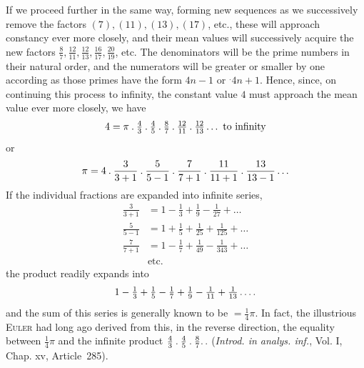 If we proceed further in the same way, forming new sequences as we successively remove the factors $(7),(11),(13),(17)$, etc., these will approach constancy ever more closely, and their mean values will successively acquire the new factors $\tfrac87,\tfrac{12}{11},\tfrac{12}{13},\tfrac{16}{17},\tfrac{20}{19}$, etc. The denominators will be the prime numbers in their natural order, and the numerators will be greater or smaller by one according as those primes have the form $4n-1$ or ${}^{.}4n+1$. Hence, since, on continuing this process to infinity, the constant value
$4$ must approach the mean value ever more closely, we have
\[
4=\pi\mathbin{.}\tfrac43\mathbin{.}\tfrac45\mathbin{.}\tfrac87\mathbin{.}\tfrac{12}{11}\mathbin{.}\tfrac{12}{13}\ldots\text{ to infinity}
\]
or
\[
\pi=4\mathbin{.}\frac3{3+1}\mathbin{.}\frac5{5-1}\mathbin{.}\frac7{7+1}\mathbin{.}\frac{11}{11+1}\mathbin{.}\frac{13}{13-1}\ldots
\]
If the individual fractions are expanded into infinite series,
\[
\begin{aligned}
\frac3{3+1}&=1-\frac13+\frac19-\frac1{27}+\ldots\\
\frac5{5-1}&=1+\frac15+\frac1{25}+\frac1{125}+\ldots\\
\frac7{7+1}&=1-\frac17+\frac1{49}-\frac1{343}+\ldots\\
&\text{etc.}
\end{aligned}
\]
the product readily expands into
\[
1-\tfrac13+\tfrac15-\tfrac17+\tfrac19-\tfrac1{11}+\tfrac1{13}\mathinner{.\,.\,.\,.}
\]
and the sum of this series is generally known to be $=\tfrac14\pi$. In fact, the illustrious \textsc{Euler} had long ago derived from this, in the reverse direction, the equality between $\tfrac14\pi$ and the infinite product $\tfrac43\mathbin{.}\tfrac45\mathbin{.}\tfrac87\ldotp\ldotp$ (\emph{Introd. in analys. inf.}, Vol. I, Chap. xv, Article~285).

